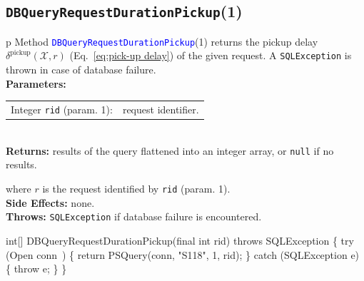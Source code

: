 \subsection{\texttt{DBQueryRequestDurationPickup}(1)}
\begin{tabular}{p{\textwidth}}
\toprule
{}
Method \textcolor{blue}{{\tt{}\protect{}DBQueryRequestDurationPickup}}(1) returns the
pickup delay $\delta^\textrm{pickup}(\mathcal{X},r)$
(Eq.~\ref{eq:pick-up delay}) of the given request.
A {\tt{}SQLException} is thrown in case of database failure.\\
\midrule
\textbf{Parameters:}\\
\begin{tabular}{lp{116mm}}
Integer {\tt{}rid} (param. 1):&request identifier.
\end{tabular}\\
\textbf{Returns:} results of the query flattened into an integer array,
or {\tt{}null} if no results.


where $r$ is the request identified by {\tt{}rid} (param. 1).\\
\textbf{Side Effects:} none.\\
\textbf{Throws:} {\tt{}SQLException} if database failure is encountered.\\
\bottomrule
\end{tabular}
\nwenddocs{}\endmoddef{}
int[] DBQueryRequestDurationPickup(final int rid) throws SQLException \{
  try (\LA{}Open \code{}conn\edoc{}~{\nwtagstyle{}}\RA{}) \{
    return PSQuery(conn, "S118", 1, rid);
  \} catch (SQLException e) \{
    throw e;
  \}
\}
\eatline
{}\nwendcode{}\nwdocspar
